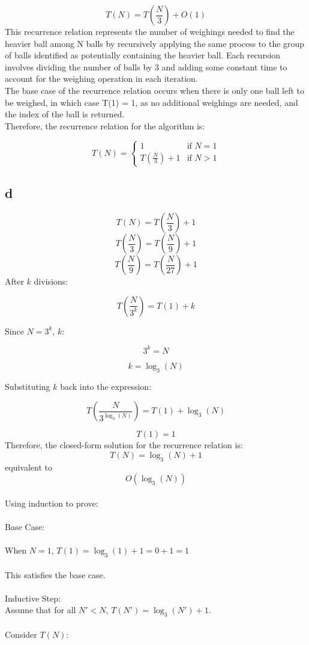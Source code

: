 \documentclass{article}
\begin{document}
\[T(N) = T\left(\frac{N}{3}\right) + O(1)\]
This recurrence relation represents the number of weighings needed to find the heavier ball among N balls by recursively applying the same process to the group of balls identified as potentially containing the heavier ball. Each recursion involves dividing the number of balls by 3 and adding some constant time to account for the weighing operation in each iteration.
\\The base case of the recurrence relation occurs when there is only one ball left to be weighed, in which case T(1) = 1, as no additional weighings are needed, and the index of the ball is returned.
\\Therefore, the recurrence relation for the algorithm is:

\[T(N) =
    \begin{cases}
        1                             & \text{if } N = 1 \\
        T\left(\frac{N}{3}\right) + 1 & \text{if } N > 1
    \end{cases}\]


\subsection*{d}
\[T(N) = T\left(\frac{N}{3}\right) + 1\]
\[T\left(\frac{N}{3}\right) = T\left(\frac{N}{9}\right) + 1\]
\[T\left(\frac{N}{9}\right) = T\left(\frac{N}{27}\right) + 1\]
After \(k\) divisions:

\[T\left(\frac{N}{3^k}\right) = T(1) + k\]

Since \(N = 3^k\), \(k\):

\[3^k = N\]

\[k = \log_3(N)\]

Substituting \(k\) back into the expression:

\[T\left(\frac{N}{3^{\log_3(N)}}\right) = T(1) + \log_3(N)\]

\[T(1) = 1\]
Therefore, the closed-form solution for the recurrence relation is:
\[T(N) = \log_3(N) + 1\] equivalent to
\[O(\log_3(N))\]\\
Using induction to prove:\\
\\Base Case:\\
\\When \(N = 1\), \(T(1) = \log_3(1) + 1 = 0 + 1 = 1\)\\
\\This satisfies the base case.\\
\\Inductive Step:
\\Assume that for all \(N' < N\), \(T(N') = \log_3(N') + 1\).
\\
\\Consider \(T(N)\):
\end{document}
